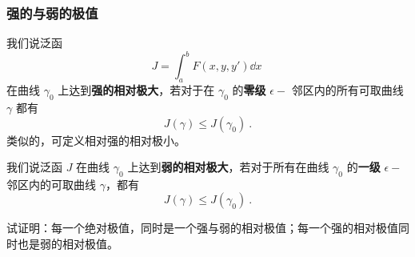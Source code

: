  \subsubsection{强的与弱的极值}
 我们说泛函
 \begin{equation}
 J=\int_a^b F(x,y,y')\dd x~
 \end{equation}
 在曲线 $\gamma_0$ 上达到\textbf{强的相对极大}，若对于在 $\gamma_0$ 的\textbf{零级} $\epsilon-$ 邻区内的所有可取曲线 $\gamma$ 都有
\begin{equation}
J(\gamma)\leq J(\gamma_0)~.
\end{equation}
 类似的，可定义相对强的相对极小。

我们说泛函 $J$ 在曲线 $\gamma_0$ 上达到\textbf{弱的相对极大}，若对于所有在曲线 $\gamma_0$ 的\textbf{一级} $\epsilon-$ 邻区内的可取曲线 $\gamma$，都有
\begin{equation}
J(\gamma)\leq J(\gamma_0)~.
\end{equation}
\begin{exercise}{}\label{exe_AbPol_1}
试证明：每一个绝对极值，同时是一个强与弱的相对极值；每一个强的相对极值同时也是弱的相对极值。
\end{exercise}